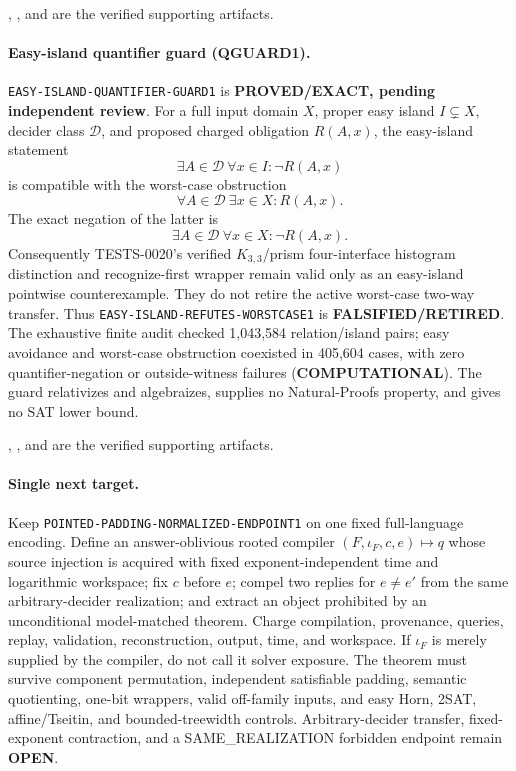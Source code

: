 \documentclass[11pt]{article}
\begin{document}
,
, and
are the verified supporting artifacts.

\paragraph{Easy-island quantifier guard (QGUARD1).}
\texttt{EASY-ISLAND-QUANTIFIER-GUARD1} is
\textbf{PROVED/EXACT, pending independent review}.  For a full input domain
\(X\), proper easy island \(I\subsetneq X\), decider class \(\mathcal D\),
and proposed charged obligation \(R(A,x)\), the easy-island statement
\[
 \exists A\in\mathcal D\ \forall x\in I:\neg R(A,x)
\]
is compatible with the worst-case obstruction
\[
 \forall A\in\mathcal D\ \exists x\in X:R(A,x).
\]
The exact negation of the latter is
\[
 \exists A\in\mathcal D\ \forall x\in X:\neg R(A,x).
\]
Consequently TESTS-0020's verified \(K_{3,3}\)/prism four-interface
histogram distinction and recognize-first wrapper remain valid only as an
easy-island pointwise counterexample.  They do not retire the active
worst-case two-way transfer.  Thus
\texttt{EASY-ISLAND-REFUTES-WORSTCASE1} is
\textbf{FALSIFIED/RETIRED}.  The exhaustive finite audit checked
1,043,584 relation/island pairs; easy avoidance and worst-case obstruction
coexisted in 405,604 cases, with zero quantifier-negation or outside-witness
failures (\textbf{COMPUTATIONAL}).  The guard relativizes and algebraizes,
supplies no Natural-Proofs property, and gives no SAT lower bound.

,
, and
are the verified supporting artifacts.

\paragraph{Single next target.}
Keep \texttt{POINTED-PADDING-NORMALIZED-ENDPOINT1} on one fixed full-language
encoding.  Define an answer-oblivious rooted compiler
\((F,\iota_F,c,e)\mapsto q\) whose source injection is acquired with fixed
exponent-independent time and logarithmic workspace; fix \(c\) before \(e\);
compel two replies for \(e\ne e'\) from the same arbitrary-decider
realization; and extract an object prohibited by an unconditional
model-matched theorem.  Charge compilation, provenance, queries, replay,
validation, reconstruction, output, time, and workspace.  If \(\iota_F\) is
merely supplied by the compiler, do not call it solver exposure.  The theorem
must survive component permutation, independent satisfiable padding, semantic
quotienting, one-bit wrappers, valid off-family inputs, and easy Horn, 2SAT,
affine/Tseitin, and bounded-treewidth controls.  Arbitrary-decider transfer,
fixed-exponent contraction, and a SAME\_REALIZATION forbidden endpoint remain
\textbf{OPEN}.
\end{document}
